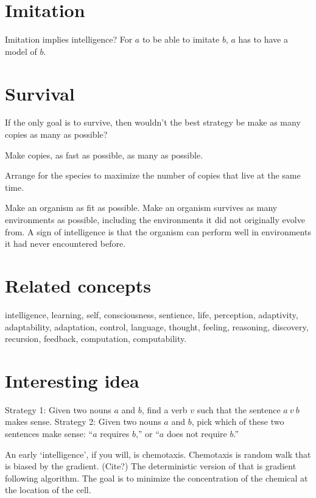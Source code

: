 \section{Imitation}

Imitation implies intelligence?
For \(a\) to be able to imitate \(b\),
\(a\) has to have a model of \(b\).

\section{Survival}

If the only goal is to survive, then wouldn't the best strategy be
make as many copies as many as possible?

Make copies, as fast as possible, as many as possible.

Arrange for the species to maximize the number of copies that live at the same time.

Make an organism as fit as possible.
Make an organism survives as many environments as possible,
including the environments it did not originally evolve from.
A sign of intelligence is that the organism can
perform well in environments it had never encountered before.

\section{Related concepts}

intelligence, learning, self, consciousness, sentience, life, perception,
adaptivity, adaptability, adaptation, control, language, thought, feeling, reasoning, discovery,
recursion, feedback, computation, computability.

\section{Interesting idea}

Strategy 1:
Given two nouns \(a\) and \(b\), find a verb \(v\) such that the sentence \(a~v~b\) makes sense.
Strategy 2:
Given two nouns \(a\) and \(b\), pick which of these two sentences make sense:
``\(a\) requires \(b\),'' or ``\(a\) does not require \(b\).''

An early `intelligence', if you will, is chemotaxis.
Chemotaxis is random walk that is biased by the gradient. (Cite?)
The deterministic version of that is gradient following algorithm.
The goal is to minimize the concentration of the chemical at the location of the cell.


